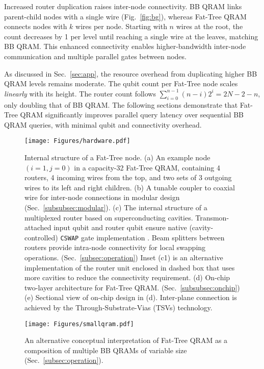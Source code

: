 Increased router duplication raises inter-node connectivity. BB QRAM links parent-child nodes with a single wire (Fig.~\ref{fig:bg}), whereas Fat-Tree QRAM connects nodes with $k$ wires per node. Starting with $n$ wires at the root, the count decreases by 1 per level until reaching a single wire at the leaves, matching BB QRAM. This enhanced connectivity enables higher-bandwidth inter-node communication and multiple parallel gates between nodes.

As discussed in Sec.~\ref{sec:app}, the resource overhead from duplicating higher BB QRAM levels remains moderate. The qubit count per Fat-Tree node scales \emph{linearly} with its height. The router count follows $\sum_{i=0}^{n - 1} (n - i)2^i = 2N - 2 - n$, only doubling that of BB QRAM. The following sections demonstrate that Fat-Tree QRAM significantly improves parallel query latency over sequential BB QRAM queries, with minimal qubit and connectivity overhead.

 \begin{figure*}[t]
         \centering
         \texttt{[image: Figures/hardware.pdf]}
         \caption{Internal structure of a Fat-Tree node. (a) An example node $(i=1,j=0)$ in a capacity-32 Fat-Tree QRAM, containing 4 routers, 4 incoming wires from the top, and two sets of 3 outgoing wires to its left and right children. (b) A tunable coupler to coaxial wire for inter-node connections in modular design (Sec.~\ref{subsubsec:modular}). (c) The internal structure of a multiplexed router based on superconducting cavities. Transmon-attached input qubit and router qubit ensure native (cavity-controlled) \texttt{CSWAP} gate implementation \cite{weiss2024quantum}. Beam splitters between routers provide intra-node connectivity for local swapping operations. (Sec.~\ref{subsec:operation}) Inset (c1) is an alternative implementation of the router unit enclosed in dashed box that uses more cavities to reduce the connectivity requirement. (d) On-chip two-layer architecture for Fat-Tree QRAM. (Sec.~\ref{subsubsec:onchip}) (e) Sectional view of on-chip design in (d). Inter-plane connection is achieved by the Through-Substrate-Vias (TSVs) technology.}
         \label{fig:hardware}
\end{figure*}

\begin{figure}[t]
         \centering
         \texttt{[image: Figures/smallqram.pdf]}
         \caption{An alternative conceptual interpretation of Fat-Tree QRAM as a composition of multiple BB QRAMs of variable size (Sec.~\ref{subsec:operation}).}
         \label{fig:small}
\end{figure}

